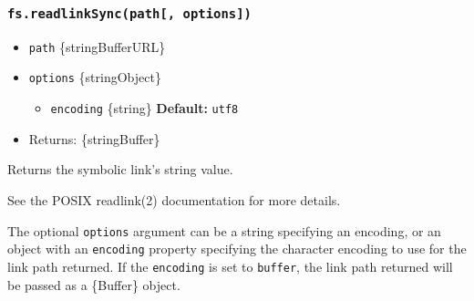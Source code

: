 \begin{Shaded}
\begin{Highlighting}[]
 \OperatorTok{;}

\NormalTok{(}\NormalTok{)}\OperatorTok{;}

\NormalTok{(}\NormalTok{)}\OperatorTok{;} 
\end{Highlighting}
\end{Shaded}

\subsubsection{\texorpdfstring{\texttt{fs.readlinkSync(path{[},\ options{]})}}{fs.readlinkSync(path{[}, options{]})}}\label{fs.readlinksyncpath-options}

\begin{itemize}
\tightlist
\item
  \texttt{path} \{string\textbar Buffer\textbar URL\}
\item
  \texttt{options} \{string\textbar Object\}

  \begin{itemize}
  \tightlist
  \item
    \texttt{encoding} \{string\} \textbf{Default:}
    \texttt{\textquotesingle{}utf8\textquotesingle{}}
  \end{itemize}
\item
  Returns: \{string\textbar Buffer\}
\end{itemize}

Returns the symbolic link's string value.

See the POSIX readlink(2) documentation for more details.

The optional \texttt{options} argument can be a string specifying an
encoding, or an object with an \texttt{encoding} property specifying the
character encoding to use for the link path returned. If the
\texttt{encoding} is set to
\texttt{\textquotesingle{}buffer\textquotesingle{}}, the link path
returned will be passed as a \{Buffer\} object.

